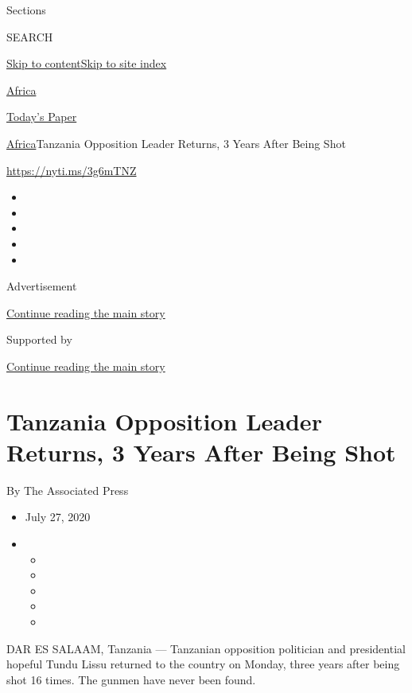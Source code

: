 Sections

SEARCH

\protect\hyperlink{site-content}{Skip to
content}\protect\hyperlink{site-index}{Skip to site index}

\href{https://www.nytimes.com/section/world/africa}{Africa}

\href{https://myaccount.nytimes.com/auth/login?response_type=cookie\&client_id=vi}{}

\href{https://www.nytimes.com/section/todayspaper}{Today's Paper}

\href{/section/world/africa}{Africa}\textbar{}Tanzania Opposition Leader
Returns, 3 Years After Being Shot

\url{https://nyti.ms/3g6mTNZ}

\begin{itemize}
\item
\item
\item
\item
\item
\end{itemize}

Advertisement

\protect\hyperlink{after-top}{Continue reading the main story}

Supported by

\protect\hyperlink{after-sponsor}{Continue reading the main story}

\hypertarget{tanzania-opposition-leader-returns-3-years-after-being-shot}{%
\section{Tanzania Opposition Leader Returns, 3 Years After Being
Shot}\label{tanzania-opposition-leader-returns-3-years-after-being-shot}}

By The Associated Press

\begin{itemize}
\item
  July 27, 2020
\item
  \begin{itemize}
  \item
  \item
  \item
  \item
  \item
  \end{itemize}
\end{itemize}

DAR ES SALAAM, Tanzania --- Tanzanian opposition politician and
presidential hopeful Tundu Lissu returned to the country on Monday,
three years after being shot 16 times. The gunmen have never been found.

